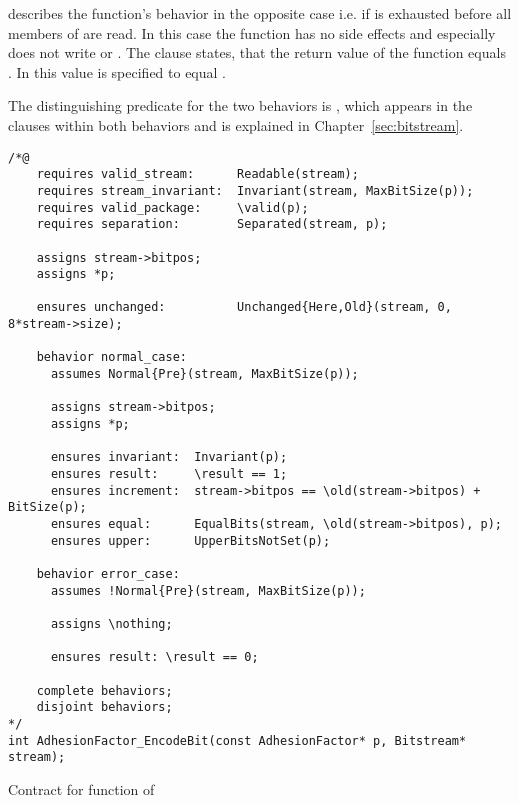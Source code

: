  describes the function's behavior in the opposite case
i.e. if  is exhausted before all members of  are read.
In this case the function has no side effects and especially does not write
 or .
The  clause  states, that the return value
of the function equals . In  this value is specified to equal .

The distinguishing predicate for the two behaviors is ,
which appears in the  clauses within both behaviors and
is explained in Chapter~\ref{sec:bitstream}. 


\begin{listing}[hbt]
\begin{minipage}{0.99\textwidth}
\begin{lstlisting}[style=acsl-block]
/*@
    requires valid_stream:      Readable(stream);
    requires stream_invariant:  Invariant(stream, MaxBitSize(p));
    requires valid_package:     \valid(p);
    requires separation:        Separated(stream, p);

    assigns stream->bitpos;
    assigns *p;

    ensures unchanged:          Unchanged{Here,Old}(stream, 0, 8*stream->size);

    behavior normal_case:
      assumes Normal{Pre}(stream, MaxBitSize(p));

      assigns stream->bitpos;
      assigns *p;

      ensures invariant:  Invariant(p);
      ensures result:     \result == 1;
      ensures increment:  stream->bitpos == \old(stream->bitpos) + BitSize(p);
      ensures equal:      EqualBits(stream, \old(stream->bitpos), p);
      ensures upper:      UpperBitsNotSet(p);

    behavior error_case:
      assumes !Normal{Pre}(stream, MaxBitSize(p));

      assigns \nothing;

      ensures result: \result == 0;

    complete behaviors;
    disjoint behaviors;
*/
int AdhesionFactor_EncodeBit(const AdhesionFactor* p, Bitstream* stream);
\end{lstlisting}
\end{minipage}
\caption{\label{lst:adhesionfactor-decodebit}Contract for  function of }
\end{listing}

